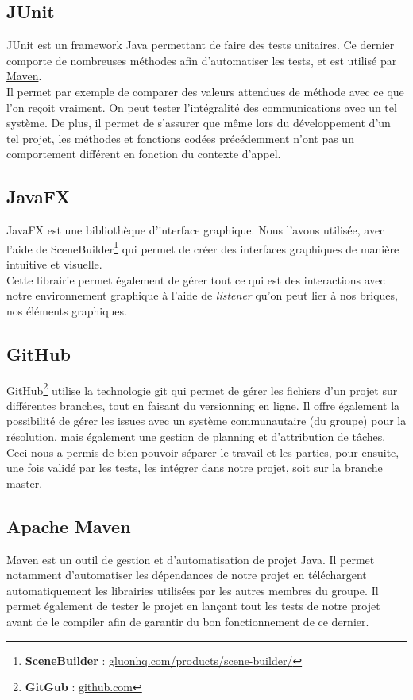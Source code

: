 \documentclass[a4paper,12pt]{article}
\begin{document}
	\subsection{JUnit}
	JUnit est un framework Java permettant de faire des tests unitaires. Ce dernier comporte de nombreuses méthodes afin d'automatiser les tests, et est utilisé par \hyperref[maven]{Maven}.\\
	Il permet par exemple de comparer des valeurs attendues de méthode avec ce que l'on reçoit vraiment. On peut tester l'intégralité des communications avec un tel système. De plus, il permet de s'assurer que même lors du développement d'un tel projet, les méthodes et fonctions codées précédemment n'ont pas un comportement différent en fonction du contexte d'appel. 
	
	\subsection{JavaFX}
	JavaFX est une bibliothèque d'interface graphique. Nous l'avons utilisée, avec l'aide de SceneBuilder\footnote{\textbf{SceneBuilder} : \href{http://gluonhq.com/products/scene-builder/}{gluonhq.com/products/scene-builder/}} qui permet de créer des interfaces graphiques de manière intuitive et visuelle. \\
	Cette librairie permet également de gérer tout ce qui est des interactions avec notre environnement graphique à l'aide de \textit{listener} qu'on peut lier à nos briques, nos éléments graphiques. 
	
	\subsection{GitHub}
	GitHub\footnote{\textbf{GitGub} : \href{http:/github.com}{github.com}} utilise la technologie git qui permet de gérer les fichiers d'un projet sur différentes branches, tout en faisant du versionning en ligne. Il offre également la possibilité de gérer les issues avec un système communautaire (du groupe) pour la résolution, mais également une gestion de planning et d'attribution de tâches. \\
	Ceci nous a permis de bien pouvoir séparer le travail et les parties, pour ensuite, une fois validé par les tests, les intégrer dans notre projet, soit sur la branche master. 
	
	\subsection{Apache Maven} \label{maven}
	Maven est un outil de gestion et d'automatisation de projet Java. Il permet notamment d'automatiser les dépendances de notre projet en téléchargent automatiquement les librairies utilisées par les autres membres du groupe. Il permet également de tester le projet en lançant tout les tests de notre projet avant de le compiler afin de garantir du bon fonctionnement de ce dernier. 
	
\end{document}
